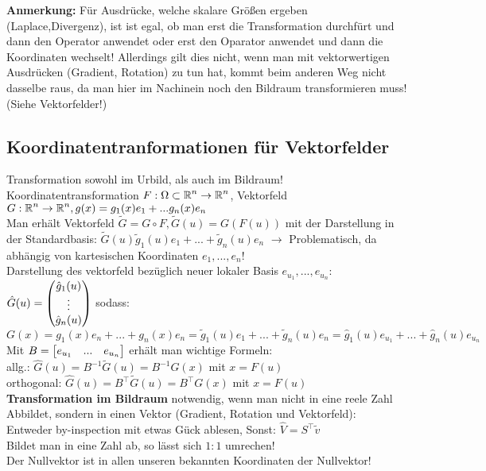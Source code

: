 \documentclass[german]{latex4ei/latex4ei_sheet}
\begin{document}
\textbf{Anmerkung:} F\"ur Ausdr\"ucke, welche skalare Gr\"o\ss{}en ergeben (Laplace,Divergenz), ist ist egal, ob man erst die Transformation durchf\"urt und dann den Operator anwendet oder erst den Oparator anwendet und dann die Koordinaten wechselt! Allerdings gilt dies nicht, wenn man mit vektorwertigen Ausdr\"ucken (Gradient, Rotation) zu tun hat, kommt beim anderen Weg nicht dasselbe raus, da man hier im Nachinein noch den Bildraum transformieren muss! (Siehe Vektorfelder!)

\subsection{Koordinatentranformationen f\"ur Vektorfelder}
Transformation sowohl im Urbild, als auch im Bildraum!\\
Koordinatentransformation $F: \Omega \subset \operatorname{\mathbb R}^n \to \operatorname{\mathbb R}^n$, Vektorfeld $G: \operatorname{\mathbb R}^n \to \operatorname{\mathbb R}^n, g(x)=g_1(x)e_1+...g_n(x)e_n$\\
Man erh\"alt Vektorfeld $\tilde{G}=G \circ F, \tilde{G}(u)=G(F(u))$ mit der Darstellung in der Standardbasis:
$\tilde{G}(u)\tilde{g}_1(u)e_1+...+\tilde{g}_n(u)e_n$ $\rightarrow$ Problematisch, da abh\"angig von kartesischen Koordinaten $e_1,...,e_n$!\\
Darstellung des vektorfeld bez\"uglich neuer lokaler Basis $e_{u_1},...,e_{u_n}$: $\hat{G}(u)=\begin{pmatrix} \hat{g}_1(u) \\ \vdots \\ \hat{g}_n(u) \end{pmatrix}$ sodass:\\
$G(x)=g_1(x)e_n+...+g_n(x)e_n=\tilde{g}_1(u)e_1+...+\tilde{g}_n(u)e_n=\hat{g}_1(u)e_{u_1}+...+\hat{g}_n(u)e_{u_n}$\\
Mit $B=\mat{e_{u_1} & ... & e_{u_n}}$ erh\"alt man wichtige Formeln:\\
allg.: $\hat{G}(u)=B^{-1}\tilde{G}(u)=B^{-1}G(x)$ mit $x=F(u)$\\
orthogonal: $\hat{G}(u)=B^\top \tilde{G}(u)=B^\top G(x)$ mit $x=F(u)$\\
\textbf{Transformation im Bildraum} notwendig, wenn man nicht in eine reele Zahl Abbildet, sondern in einen Vektor (Gradient, Rotation und Vektorfeld):\\
Entweder by-inspection mit etwas G\"uck ablesen, Sonst: $\hat{V}=S^\top \tilde{v}$\\
Bildet man in eine Zahl ab, so l\"asst sich $1:1$ umrechen!\\
Der Nullvektor ist in allen unseren bekannten Koordinaten der Nullvektor!\\
\end{document}
